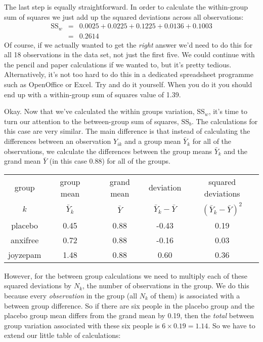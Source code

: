 \noindent
The last step is equally straightforward. In order to calculate the within-group sum of squares we just add up the squared deviations across all observations:
$$
\begin{array}{rcl}
\mbox{SS}_w &=& 0.0025 + 0.0225 + 0.1225 + 0.0136 + 0.1003 \\
&=& 0.2614
\end{array}
$$
\noindent
Of course, if we actually wanted to get the {\it right} answer we'd need to do this for all 18 observations in the data set, not just the first five. We could continue with the pencil and paper calculations if we wanted to, but it's pretty tedious. Alternatively, it's not too hard to do this in a dedicated spreadsheet programme such as OpenOffice or Excel. Try and do it yourself. When you do it you should end up with a within-group sum of squares value of 1.39. 

Okay. Now that we've calculated the within groups variation, $\mbox{SS}_w$, it's time to turn our attention to the between-group sum of squares, $\mbox{SS}_b$. The calculations for this case are very similar. The main difference is that instead of calculating the differences between an observation $Y_{ik}$ and a group mean $\bar{Y}_k$ for all of the observations, we calculate the differences between the group means $\bar{Y}_k$ and the grand mean $\bar{Y}$ (in this case 0.88) for all of the groups. 

\small
\vspace*{6pt}
\begin{tabular}{c|c|c|c|c}
 group & group mean  & grand mean & deviation               & squared deviations \\  
  $k$  & $\bar{Y}_k$ & $\bar{Y}$  & $\bar{Y}_{k} - \bar{Y}$ & $(\bar{Y}_{k} - \bar{Y})^2$ \\  \hline
placebo   & 0.45  &  0.88 &  -0.43 &  0.19 \\
anxifree  & 0.72  &  0.88 &  -0.16 &  0.03 \\
joyzepam  & 1.48  &  0.88 &  0.60  &  0.36 \\
\end{tabular}
\vspace*{6pt}
\normalsize

\noindent
However, for the between group calculations we need to multiply each of these squared deviations by $N_k$, the number of observations in the group. We do this because every {\it observation} in the group (all $N_k$ of them) is associated with a between group difference. So if there are six people in the placebo group and the placebo group mean differs from the grand mean by 0.19, then the {\it total} between group variation associated with these six people is $6 \times 0.19 = 1.14$. So we have to extend our little table of calculations:

